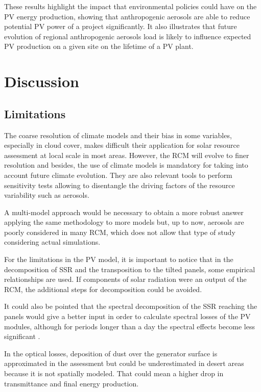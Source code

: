 These results highlight the impact that environmental policies could have on the PV energy production, showing that anthropogenic aerosols are able to reduce potential PV power of a project significantly. It also illustrates that future evolution of regional anthropogenic aerosols load is likely to influence expected PV production on a given site on the lifetime of a PV plant.

\section{Discussion}
\subsection{Limitations}

The coarse resolution of climate models and their bias in some variables, especially in cloud cover, makes difficult their application for solar resource assessment at local scale in most areas. However, the RCM will evolve to finer resolution and besides, the use of climate models is mandatory for taking into account future climate evolution. They are also relevant tools to perform sensitivity tests allowing to disentangle the driving factors of the resource variability such as aerosols. 

A multi-model approach would be necessary to obtain a more robust answer applying the same methodology to more models but, up to now, aerosols are poorly considered in many RCM, which does not allow that type of study considering actual simulations. 

For the limitations in the PV model, it is important to notice that in the decomposition of SSR and the transposition to the tilted panels, some empirical relationships are used. If components of solar radiation were an output of the RCM, the additional steps for decomposition could be avoided.

It could also be pointed that the spectral decomposition of the SSR reaching the panels would give a better input in order to calculate spectral losses of the PV modules, although for periods longer than a day the spectral effects become less significant \cite*{Martin1999}.

In the optical losses, deposition of dust over the generator surface is approximated in the assessment but could be underestimated in desert areas because it is not spatially modeled. That could mean a higher drop in transmittance and final energy production.

